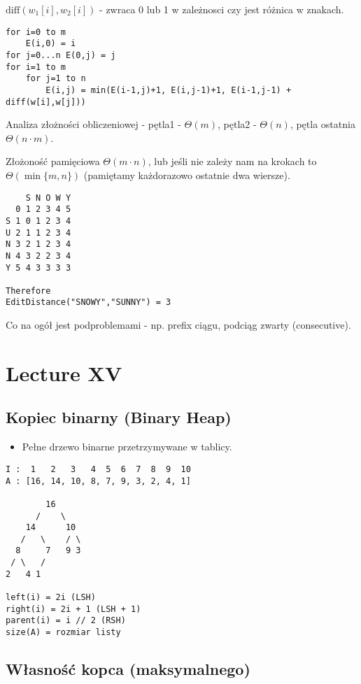 \documentclass{article}
\numberwithin{equation}{subsection}
\begin{document}
$\text{diff}(w_1[i],w_2[i])$ - zwraca 0 lub 1 w zależnosci czy jest różnica w znakach.

\begin{verbatim}
for i=0 to m
    E(i,0) = i
for j=0...n E(0,j) = j
for i=1 to m
    for j=1 to n
        E(i,j) = min(E(i-1,j)+1, E(i,j-1)+1, E(i-1,j-1) + diff(w[i],w[j]))
\end{verbatim}

Analiza złożności obliczeniowej - pętla1 - $\Theta(m)$, pętla2 - $\Theta(n)$, pętla ostatnia $\Theta(n\cdot m)$.

Złożoność pamięciowa $\Theta(m\cdot n)$, lub jeśli nie zależy nam na krokach to $\Theta(\min\{m,n\})$
(pamiętamy każdorazowo ostatnie dwa wiersze).

\begin{verbatim}
    S N O W Y
  0 1 2 3 4 5
S 1 0 1 2 3 4
U 2 1 1 2 3 4
N 3 2 1 2 3 4
N 4 3 2 2 3 4
Y 5 4 3 3 3 3

Therefore
EditDistance("SNOWY","SUNNY") = 3
\end{verbatim}

Co na ogół jest podproblemami - np. prefix ciągu, podciąg zwarty (consecutive).

\section{Lecture XV}

\subsection{Kopiec binarny (Binary Heap)}

\begin{itemize}
    \item Pełne drzewo binarne przetrzymywane w tablicy.
\end{itemize}

\begin{verbatim}
I :  1   2   3   4  5  6  7  8  9  10
A : [16, 14, 10, 8, 7, 9, 3, 2, 4, 1]
       
        16
      /    \ 
    14      10
   /   \    / \
  8     7   9 3
 / \   /
2   4 1

left(i) = 2i (LSH)
right(i) = 2i + 1 (LSH + 1)
parent(i) = i // 2 (RSH)
size(A) = rozmiar listy
\end{verbatim}

\subsection{Własność kopca (maksymalnego)}
\end{document}
